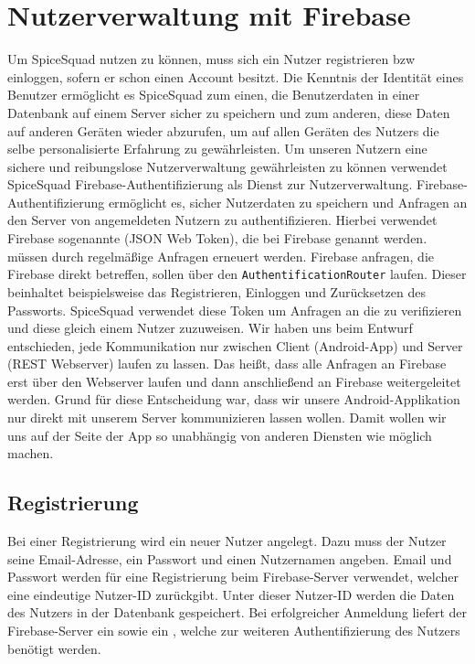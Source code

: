 \documentclass{entwurfsheft}
\begin{document}
\begin{sloppypar}
\section{Nutzerverwaltung mit Firebase}\label{sec:Nutzerverwaltung}
Um SpiceSquad nutzen zu können, muss sich ein Nutzer registrieren bzw einloggen, sofern er schon einen Account besitzt.
Die Kenntnis der Identität eines Benutzer ermöglicht es SpiceSquad zum einen, die Benutzerdaten in einer Datenbank auf einem Server sicher zu speichern und zum anderen, diese Daten auf anderen Geräten wieder abzurufen, um auf allen Geräten des Nutzers die selbe personalisierte Erfahrung zu gewährleisten.
Um unseren Nutzern eine sichere und reibungslose Nutzerverwaltung gewährleisten zu können verwendet SpiceSquad Firebase-Authentifizierung als Dienst zur Nutzerverwaltung.
Firebase-Authentifizierung ermöglicht es, sicher Nutzerdaten zu speichern und Anfragen an den Server von angemeldeten Nutzern zu authentifizieren.
Hierbei verwendet Firebase sogenannte  (JSON Web Token), die bei Firebase  genannt werden.
 müssen durch regelmäßige Anfragen erneuert werden.
Firebase anfragen, die Firebase direkt betreffen, sollen über den \texttt{AuthentificationRouter} laufen.
Dieser beinhaltet beispielsweise das Registrieren, Einloggen und Zurücksetzen des Passworts.
SpiceSquad verwendet diese Token um Anfragen an die  zu verifizieren und diese gleich einem Nutzer zuzuweisen.
Wir haben uns beim Entwurf entschieden, jede Kommunikation nur zwischen Client (Android-App) und Server (REST Webserver) laufen zu lassen. Das heißt, dass alle Anfragen an Firebase erst über den  Webserver laufen und dann anschließend an Firebase weitergeleitet werden.
Grund für diese Entscheidung war, dass wir unsere Android-Applikation nur direkt mit unserem Server kommunizieren lassen wollen. Damit wollen wir uns auf der Seite der App so unabhängig von anderen Diensten wie möglich machen.

\subsection{Registrierung}
Bei einer Registrierung wird ein neuer Nutzer angelegt. Dazu muss der Nutzer seine Email-Adresse, ein Passwort und einen Nutzernamen angeben. Email und Passwort werden für eine Registrierung beim Firebase-Server verwendet, welcher eine eindeutige Nutzer-ID zurückgibt. Unter dieser Nutzer-ID werden die Daten des Nutzers in der Datenbank gespeichert. Bei erfolgreicher Anmeldung liefert der Firebase-Server ein  sowie ein , welche zur weiteren Authentifizierung des Nutzers benötigt werden.


\end{sloppypar}
\end{document}
